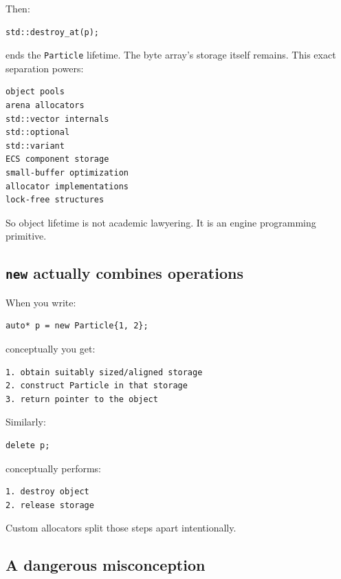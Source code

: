 Then:

\begin{verbatim}
std::destroy_at(p);
\end{verbatim}

ends the \texttt{Particle} lifetime. The byte array's storage itself remains. This exact separation powers:

\begin{verbatim}
object pools
arena allocators
std::vector internals
std::optional
std::variant
ECS component storage
small-buffer optimization
allocator implementations
lock-free structures
\end{verbatim}

So object lifetime is not academic lawyering. It is an engine programming primitive.

\subsection{\texorpdfstring{\texttt{new} actually combines operations}{new actually combines operations}}\label{01-foundations-i-ch002-new-actually-combines-operations}

When you write:

\begin{verbatim}
auto* p = new Particle{1, 2};
\end{verbatim}

conceptually you get:

\begin{verbatim}
1. obtain suitably sized/aligned storage
2. construct Particle in that storage
3. return pointer to the object
\end{verbatim}

Similarly:

\begin{verbatim}
delete p;
\end{verbatim}

conceptually performs:

\begin{verbatim}
1. destroy object
2. release storage
\end{verbatim}

Custom allocators split those steps apart intentionally.

\subsection{A dangerous misconception}\label{01-foundations-i-ch002-a-dangerous-misconception}

